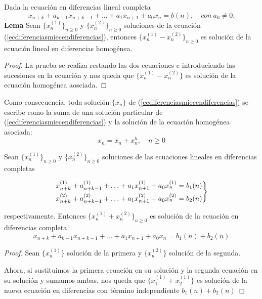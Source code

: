     Dada la ecuación en diferencias lineal completa
     \begin{equation} \label{ecdiferenciasmiecendiferencias}
      x_{n+k} + a_{k-1}x_{n+k-1} + \hdots + a_{1}x_{n+1} + a_{0}x_{n} = b(n), \quad
      con\ a_{0} \neq 0.
\end{equation}
      \textbf{Lema}
      Sean $\{x_{n}^{(1)}\}_{n \geq 0}$ y $\{x_{n}^{(2)}\}_{n \geq 0}$ soluciones de
      la ecuación (\ref {ecdiferenciasmiecendiferencias}), entonces
      $\{x_{n}^{(1)} - x_{n}^{(2)}\}_{n \geq 0}$ es solución de la ecuación lineal
      en diferencias homogénea.\\

\begin{proof}
	La prueba se realiza restando las dos ecuaciones e introduciendo las sucesiones en la ecuación y nos queda que $\{x_n^{(1)}-x_n^{(2)}\}$ es solución de la ecuación homogénea aosciada.
\end{proof}

\begin{nota}
	Como consecuencia, toda solución $\{x_n\}$ de (\ref{ecdiferenciasmiecendiferencias}) se escribe como la suma de una solución particular de (\ref{ecdiferenciasmiecendiferencias}) y la solución de la ecuación homogénea asociada: $$x_n = \overline{x_n} + x_n^h, \quad n \ge 0$$
\end{nota}


      \begin{nth}
        Sean $\{x_{n}^{(1)}\}_{n\geq0}$ y $\{x_{n}^{(2)}\}_{n\geq0}$ soluciones de
        las ecuaciones lineales en diferencias completas
      \end{nth}

       $$
        \begin{rcases}
         x_{n+k}^{(1)} + a_{n+k-1}^{(1)} + \hdots + a_{1}x_{n+1}^{(1)} +
         a_{0}x_{n}^{(1)} = b_{1}(n) \\
         x_{n+k}^{(2)} + a_{n+k-1}^{(2)} + \hdots + a_{1}x_{n+1}^{(2)} +
         a_{0}x_{n}^{(2)} = b_{2}(n) \\
        \end{rcases}
        $$

        respectivamente. Entonces $\{x_{n}^{(1)}+ x_{n}^{(2)}\}_{n \geq 0}$ es
        solución de la ecuación en diferencias completa
           $$x_{n+k} + a_{k-1}x_{n+k-1} + \hdots + a_{1}x_{n+1} + a_{0}x_{n} =
        b_{1}(n) + b_{2}(n)$$


\begin{proof}
	Sean $\{x_n^{(1)}\}$ solución de la primera y $\{ x_n^{(2)}\}$ solución de la segunda.

Ahora, si sustituimos la primera ecuación en su solución y la segunda ecuación en su solución y sumamos ambas, nos queda que $\{x_1^{(1)} + x_2^{(1)}\}$ es solución de la nueva ecuación en diferencias con término independiente $b_1(n)+b_2(n)$
\end{proof}

